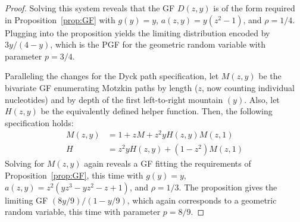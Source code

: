 \documentclass{article}
\begin{document}
\begin{proof}
    Solving this system reveals that the GF $D(z, y)$ is of the form required in Proposition~\ref{prop:GF} with $g(y) = y$, $a(z, y) = y(z^2 - 1)$, and $\rho = 1/4$.  Plugging into the proposition yields the limiting distribution encoded by $3y/(4-y)$, which is the PGF for the geometric random variable with parameter $p = 3/4$.
   
    Paralleling the changes for the Dyck path specification, let $M(z, y)$ be the bivariate GF enumerating Motzkin paths by length ($z$, now counting individual nucleotides) and by depth of the first left-to-right mountain $(y)$.  Also, let $H(z, y)$ be the equivalently defined helper function.  Then, the following specification holds:
    \begin{align*}
    M(z, y) &= 1 + zM + z^2yH(z, y)M(z, 1)\\
    H &= z^2yH(z, y) + (1-z^2)M(z, 1)
    \end{align*}
    Solving for $M(z, y)$ again reveals a GF fitting the requirements of Proposition~\ref{prop:GF}, this time with $g(y) = y$, $a(z, y) = z^2(yz^3 - yz^2 - z + 1)$, and $\rho = 1/3$.  The proposition gives the limiting GF $(8y/9)/(1-y/9)$,
    which again corresponds to a geometric random variable, this time with parameter $p = 8/9$.


\end{proof}
\end{document}
